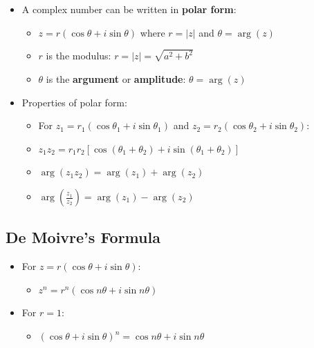 \documentclass[
]{book}
\providecommand{\tightlist}{%
  \setlength{\itemsep}{0pt}\setlength{\parskip}{0pt}}
\theoremstyle{definition}
\theoremstyle{definition}
\theoremstyle{definition}
\theoremstyle{definition}
\theoremstyle{remark}
\begin{document}
\begin{itemize}
\tightlist
\item
  A complex number can be written in \textbf{polar form}:

  \begin{itemize}
  \tightlist
  \item
    \(z = r(\cos\theta + i\sin\theta)\) where \(r = |z|\) and \(\theta = \arg(z)\)
  \item
    \(r\) is the modulus: \(r = |z| = \sqrt{a^2 + b^2}\)
  \item
    \(\theta\) is the \textbf{argument} or \textbf{amplitude}: \(\theta = \arg(z)\)
  \end{itemize}
\item
  Properties of polar form:

  \begin{itemize}
  \tightlist
  \item
    For \(z_1 = r_1(\cos\theta_1 + i\sin\theta_1)\) and \(z_2 = r_2(\cos\theta_2 + i\sin\theta_2)\):
  \item
    \(z_1z_2 = r_1r_2[\cos(\theta_1 + \theta_2) + i\sin(\theta_1 + \theta_2)]\)
  \item
    \(\arg(z_1z_2) = \arg(z_1) + \arg(z_2)\)
  \item
    \(\arg\left(\frac{z_1}{z_2}\right) = \arg(z_1) - \arg(z_2)\)
  \end{itemize}
\end{itemize}

\subsection{De Moivre's Formula}\label{de-moivres-formula}

\begin{itemize}
\tightlist
\item
  For \(z = r(\cos\theta + i\sin\theta)\):

  \begin{itemize}
  \tightlist
  \item
    \(z^n = r^n(\cos n\theta + i\sin n\theta)\)
  \end{itemize}
\item
  For \(r = 1\):

  \begin{itemize}
  \tightlist
  \item
    \((\cos\theta + i\sin\theta)^n = \cos n\theta + i\sin n\theta\)
  \end{itemize}
\end{itemize}
\end{document}
